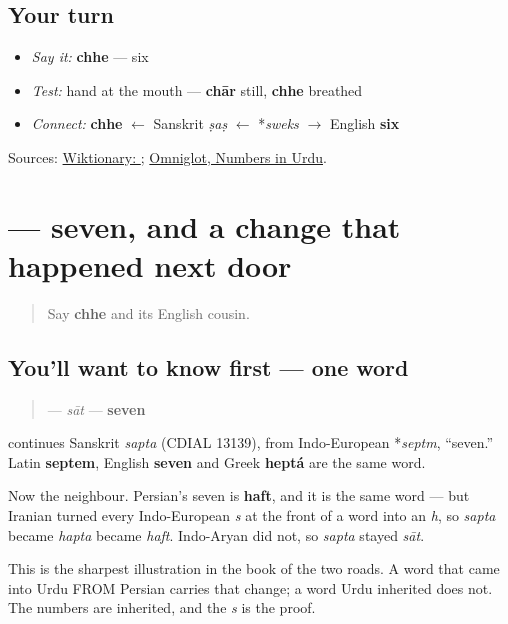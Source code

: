 \subsection*{Your turn}
\begin{itemize}
\raggedright
  \item \emph{Say it:} \textbf{chhe} — six
  \item \emph{Test:} hand at the mouth — \textbf{chār} still, \textbf{chhe} breathed
  \item \emph{Connect:} \textbf{chhe} $\leftarrow$ Sanskrit \emph{ṣaṣ} $\leftarrow$ *\emph{sweks} $\to$ English \textbf{six}
\end{itemize}

\begin{tcolorbox}[breakable,colback=teal!4,colframe=teal!35!black,title={Before you move on}]
Sources: \href{https://en.wiktionary.org/wiki/\%DA\%86\%DA\%BE}{Wiktionary: }; \href{https://www.omniglot.com/language/numbers/urdu.htm}{Omniglot, Numbers in Urdu}.
\end{tcolorbox}
\section[\texorpdfstring{\ur{سات} (sāt)}{سات (sāt)}]{ — seven, and a change that happened next door}

\label{lesson:UR-C29-saat}



\begin{quote}
Say \textbf{chhe} and its English cousin.
\end{quote}

\subsection*{You'll want to know first — one word}
\begin{quote}
\textbf{} — \emph{sāt} — \textbf{seven}
\end{quote}

\begin{cousinweb}
\textbf{} continues Sanskrit \emph{sapta} (CDIAL 13139), from Indo-European *\emph{septm}, \textquotedblleft{}seven.\textquotedblright{} Latin \textbf{septem}, English \textbf{seven} and Greek \textbf{heptá} are the same word.

Now the neighbour. Persian's seven is \textbf{haft}, and it is the same word — but Iranian turned every Indo-European \emph{s} at the front of a word into an \emph{h}, so \emph{sapta} became \emph{hapta} became \emph{haft}. Indo-Aryan did not, so \emph{sapta} stayed \emph{sāt}.

This is the sharpest illustration in the book of the two roads. A word that came into Urdu FROM Persian carries that change; a word Urdu inherited does not. The numbers are inherited, and the \emph{s} is the proof.
\end{cousinweb}

